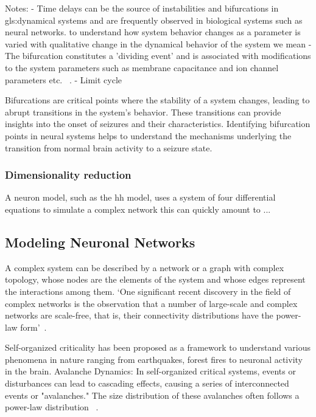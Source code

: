 \documentclass[../../Orator.tex]{subfiles}
\begin{document}
Notes:
- Time delays can be the source of instabilities and bifurcations in \gls{gls:dynamical system}s and are frequently observed in biological systems such as neural networks.
 to understand how system behavior changes as a parameter is varied
with qualitative change in the dynamical behavior of the system we mean 
- The bifurcation constitutes a 'dividing event' and is associated with modifications to the system parameters such as membrane capacitance and ion channel parameters etc. ~\cite{STEFANESCU2012748}.
- Limit cycle


Bifurcations are critical points where the stability of a system changes, leading to abrupt transitions in the system's behavior. These transitions can provide insights into the onset of seizures and their characteristics.
Identifying bifurcation points in neural systems helps to understand the mechanisms underlying the transition from normal brain activity to a seizure state.

\subsubsection{Dimensionality reduction}
A neuron model, such as the \gls{hh} model, uses a system of four differential equations
to simulate a complex network this can quickly amount to ...



\subsection*{Modeling Neuronal Networks}
A complex system can be described by a network or a graph with complex topology, whose nodes are the elements of the system and whose edges represent the interactions among them. `One significant recent discovery in the field of complex networks is the observation that a number of large-scale and complex networks are scale-free, that is, their connectivity distributions have the
power-law form'~\cite{wang2002synchronization}.


Self-organized criticality has been proposed as a framework to understand various phenomena in nature ranging from earthquakes, forest fires to neuronal activity in the brain.
Avalanche Dynamics: In self-organized critical systems, events or disturbances can lead to cascading effects, causing a series of interconnected events or "avalanches." The size distribution of these avalanches often follows a power-law distribution ~\cite{beggs2004neuronal, plenz2007organizing}.
\end{document}
